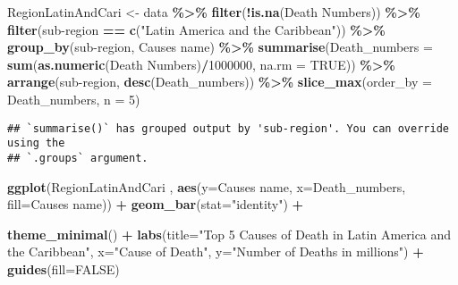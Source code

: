\documentclass[
]{article}
\newenvironment{Shaded}{\begin{snugshade}}{\end{snugshade}}
\newcommand{\AttributeTok}[1]{\textcolor[rgb]{0.13,0.29,0.53}{#1}}
\newcommand{\ConstantTok}[1]{\textcolor[rgb]{0.56,0.35,0.01}{#1}}
\newcommand{\DecValTok}[1]{\textcolor[rgb]{0.00,0.00,0.81}{#1}}
\newcommand{\FunctionTok}[1]{\textcolor[rgb]{0.13,0.29,0.53}{\textbf{#1}}}
\newcommand{\NormalTok}[1]{#1}
\newcommand{\OtherTok}[1]{\textcolor[rgb]{0.56,0.35,0.01}{#1}}
\newcommand{\SpecialCharTok}[1]{\textcolor[rgb]{0.81,0.36,0.00}{\textbf{#1}}}
\newcommand{\StringTok}[1]{\textcolor[rgb]{0.31,0.60,0.02}{#1}}
\begin{document}
\begin{Shaded}
\begin{Highlighting}[]
\NormalTok{RegionLatinAndCari }\OtherTok{\textless{}{-}}\NormalTok{ data }\SpecialCharTok{\%\textgreater{}\%}
  \FunctionTok{filter}\NormalTok{(}\SpecialCharTok{!}\FunctionTok{is.na}\NormalTok{(}\StringTok{\textasciigrave{}}\AttributeTok{Death Numbers}\StringTok{\textasciigrave{}}\NormalTok{)) }\SpecialCharTok{\%\textgreater{}\%}
  \FunctionTok{filter}\NormalTok{(}\StringTok{\textasciigrave{}}\AttributeTok{sub{-}region}\StringTok{\textasciigrave{}} \SpecialCharTok{==} \FunctionTok{c}\NormalTok{(}\StringTok{"Latin America and the Caribbean"}\NormalTok{)) }\SpecialCharTok{\%\textgreater{}\%}
  \FunctionTok{group\_by}\NormalTok{(}\StringTok{\textasciigrave{}}\AttributeTok{sub{-}region}\StringTok{\textasciigrave{}}\NormalTok{, }\StringTok{\textasciigrave{}}\AttributeTok{Causes name}\StringTok{\textasciigrave{}}\NormalTok{) }\SpecialCharTok{\%\textgreater{}\%}
  \FunctionTok{summarise}\NormalTok{(}\AttributeTok{Death\_numbers =} \FunctionTok{sum}\NormalTok{(}\FunctionTok{as.numeric}\NormalTok{(}\StringTok{\textasciigrave{}}\AttributeTok{Death Numbers}\StringTok{\textasciigrave{}}\NormalTok{)}\SpecialCharTok{/}\DecValTok{1000000}\NormalTok{, }\AttributeTok{na.rm =} \ConstantTok{TRUE}\NormalTok{)) }\SpecialCharTok{\%\textgreater{}\%}
  \FunctionTok{arrange}\NormalTok{(}\StringTok{\textasciigrave{}}\AttributeTok{sub{-}region}\StringTok{\textasciigrave{}}\NormalTok{, }\FunctionTok{desc}\NormalTok{(Death\_numbers)) }\SpecialCharTok{\%\textgreater{}\%}
  \FunctionTok{slice\_max}\NormalTok{(}\AttributeTok{order\_by =}\NormalTok{ Death\_numbers, }\AttributeTok{n =} \DecValTok{5}\NormalTok{)}
\end{Highlighting}
\end{Shaded}

\begin{verbatim}
## `summarise()` has grouped output by 'sub-region'. You can override using the
## `.groups` argument.
\end{verbatim}

\begin{Shaded}
\begin{Highlighting}[]
\FunctionTok{ggplot}\NormalTok{(RegionLatinAndCari , }\FunctionTok{aes}\NormalTok{(}\AttributeTok{y=}\StringTok{\textasciigrave{}}\AttributeTok{Causes name}\StringTok{\textasciigrave{}}\NormalTok{, }\AttributeTok{x=}\NormalTok{Death\_numbers, }\AttributeTok{fill=}\StringTok{\textasciigrave{}}\AttributeTok{Causes name}\StringTok{\textasciigrave{}}\NormalTok{)) }\SpecialCharTok{+}
  \FunctionTok{geom\_bar}\NormalTok{(}\AttributeTok{stat=}\StringTok{"identity"}\NormalTok{) }\SpecialCharTok{+}
 
  \FunctionTok{theme\_minimal}\NormalTok{() }\SpecialCharTok{+} 
  \FunctionTok{labs}\NormalTok{(}\AttributeTok{title=}\StringTok{"Top 5 Causes of Death in Latin America and the Caribbean"}\NormalTok{,}
       \AttributeTok{x=}\StringTok{"Cause of Death"}\NormalTok{,}
       \AttributeTok{y=}\StringTok{"Number of Deaths in millions"}\NormalTok{) }\SpecialCharTok{+}
  \FunctionTok{guides}\NormalTok{(}\AttributeTok{fill=}\ConstantTok{FALSE}\NormalTok{)}
\end{Highlighting}
\end{Shaded}
\end{document}
